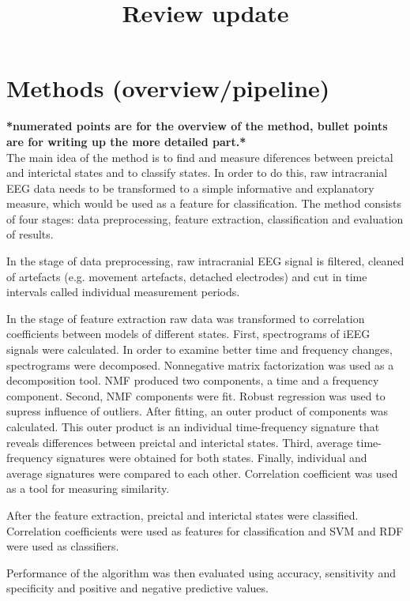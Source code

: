 \documentclass{article}
\title{\fontsize{16}{12}\selectfont{}\textbf{Review update}}
\date{}
\begin{document}
\maketitle

\section{Methods (overview/pipeline)}

\textbf{*numerated points are for the overview of the method, bullet points are for writing up the more detailed part.*} \\

The main idea of the method is to find and measure diferences between preictal and interictal states and to classify states. In order to do this, raw intracranial EEG data needs to be transformed to a simple informative and explanatory measure, which would be used as a feature for classification. The method consists of four stages: data preprocessing, feature extraction, classification and evaluation of results. 

In the stage of data preprocessing, raw intracranial EEG signal is filtered, cleaned of artefacts (e.g. movement artefacts, detached electrodes) and cut in time intervals called individual measurement periods. 

In the stage of feature extraction raw data was transformed to correlation coefficients between models of different states. 
First, spectrograms of iEEG signals were calculated. In order to examine better time and frequency changes, spectrograms were decomposed. Nonnegative matrix factorization was used as a decomposition tool. NMF produced two components, a time and a frequency component. 
Second, NMF components were fit. Robust regression was used to supress influence of outliers. After fitting, an outer product of components was calculated. This outer product is an individual time-frequency signature that reveals differences between preictal and interictal states. 
Third, average time-frequency signatures were obtained for both states. 
Finally, individual and average signatures were compared to each other. Correlation coefficient was used as a tool for measuring similarity. 

After the feature extraction, preictal and interictal states were classified. Correlation coefficients were used as features for classification and SVM and RDF were used as classifiers. 

Performance of the algorithm was then evaluated using accuracy, sensitivity and specificity and positive and negative predictive values. 
\end{document}

